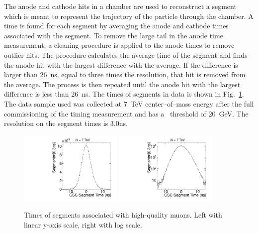 The anode and cathode hits in a chamber are used to reconstruct a segment which is meant to represent the trajectory of the particle through the chamber. A time is
found for each segment by averaging the anode and cathode times associated with the segment. 
To remove the large tail in the anode time measurement,
a cleaning procedure is applied to the anode times to remove outlier hits. The procedure calculates the average time of the segment and finds the anode hit with the largest
difference with the average. If the difference is larger than 26~ns, equal to three times the resolution,
that hit is removed from the average. The process is then repeated until the
anode hit with the largest difference is less than 26~ns.
The times of segments in data is shown in Fig.~\ref{fig:SegTimes}. 
The data sample used was collected at 7~TeV center--of--mass energy after the full commissioning of the timing measurement and has a \pt\ threshold of 20~GeV.
The resolution on the segment times is 3.0ns.

\begin{figure}
  \begin{center}
      \includegraphics[width=0.44\textwidth]{figures/timing/StripAndWireSegmentTime}
      \includegraphics[width=0.44\textwidth]{figures/timing/StripAndWireSegmentTimeLog}
      \caption[Distribution of times of segments]
      {Times of segments associated with high-quality muons. Left with linear y-axis scale, right with log scale.
        }
      \label{fig:SegTimes}
  \end{center}
\end{figure}

